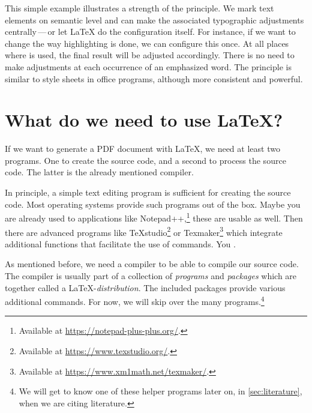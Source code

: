 This simple example illustrates a strength of the  principle. 
We mark text elements on  semantic level and can make the associated typographic adjustments centrally\,---\,or let \LaTeX{} do the configuration itself.
For instance, if we want to change the way highlighting is done, we can configure this once. 
At all places where \texttt{\emph{}} is used, the final result will be adjusted accordingly. 
There is no need to make adjustments at each occurrence of an emphasized word. 
The principle is similar to style sheets in office programs, although more consistent and powerful.

\section{What do we need to use \LaTeX{}?}
\label{subsec:what-we-need}

If we want to generate a PDF document with \LaTeX{}, we need at least two programs. 
One to create the source code, and a second to process the source code. 
The latter is the already mentioned compiler.

In principle, a simple text editing program is sufficient for creating the source code. 
Most operating systems provide such programs out of the box. 
Maybe you are already used to applications like Notepad++,\footnote{Available at \url{https://notepad-plus-plus.org/}.} these are usable as well. 
Then there are advanced programs like \TeX{}studio\footnote{Available at \url{https://www.texstudio.org/}.} or Texmaker\footnote{Available at \url{https://www.xm1math.net/texmaker/}.} which integrate additional functions that facilitate the use of commands.
You .

As mentioned before, we need a compiler to be able to compile our source code.
The compiler is usually part of a collection of \emph{programs} and \emph{packages} which are together called a \LaTeX-\emph{distribution}. 
The included packages provide various additional commands. 
For now, we will skip over the many programs.\footnote{We will get to know one of these helper programs later on, in \ref{sec:literature}, when we are citing literature.}

